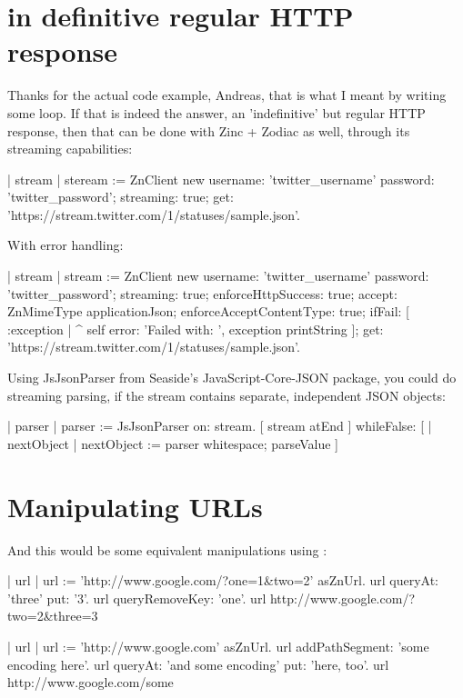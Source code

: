 \documentclass[a4paper,10pt,twoside]{book}
\begin{document}
\section{in definitive regular HTTP response}
Thanks for the actual code example, Andreas, that is what I meant by writing some loop. If that is indeed the answer, an 'indefinitive' but regular HTTP response, then that can be done with Zinc + Zodiac as well, through its streaming capabilities: 

\begin{code}
| stream |
steream := ZnClient new
	username: 'twitter_username' password: 'twitter_password';
	streaming: true;
	get: 'https://stream.twitter.com/1/statuses/sample.json'.
\end{code}

With error handling:

\begin{code}
| stream |
stream := ZnClient new
	username: 'twitter_username' password: 'twitter_password';
	streaming: true;
	enforceHttpSuccess: true; 
	accept: ZnMimeType applicationJson;
	enforceAcceptContentType: true; 
	ifFail: [ :exception | ^ self error: 'Failed with: ', exception printString ]; 
	get: 'https://stream.twitter.com/1/statuses/sample.json'.
\end{code}

Using JsJsonParser from Seaside's JavaScript-Core-JSON package, you could do streaming parsing, if the stream contains separate, independent JSON objects:

\begin{code}
| parser |
parser := JsJsonParser on: stream.
[ stream atEnd ] whileFalse: [ | nextObject |
	nextObject := parser whitespace; parseValue ]
\end{code}





\section{Manipulating URLs}

And this would be some equivalent manipulations using :

\begin{code}{}
| url |
url := 'http://www.google.com/?one=1&two=2' asZnUrl.
url queryAt: 'three' put: '3'.
url queryRemoveKey: 'one'.
url
\returns http://www.google.com/?two=2&three=3
\end{code}

\begin{code}{}
| url |
url := 'http://www.google.com' asZnUrl.
url addPathSegment: 'some encoding here'.
url queryAt: 'and some encoding' put: 'here, too'.
url 
http://www.google.com/some%
\end{code}
\end{document}
